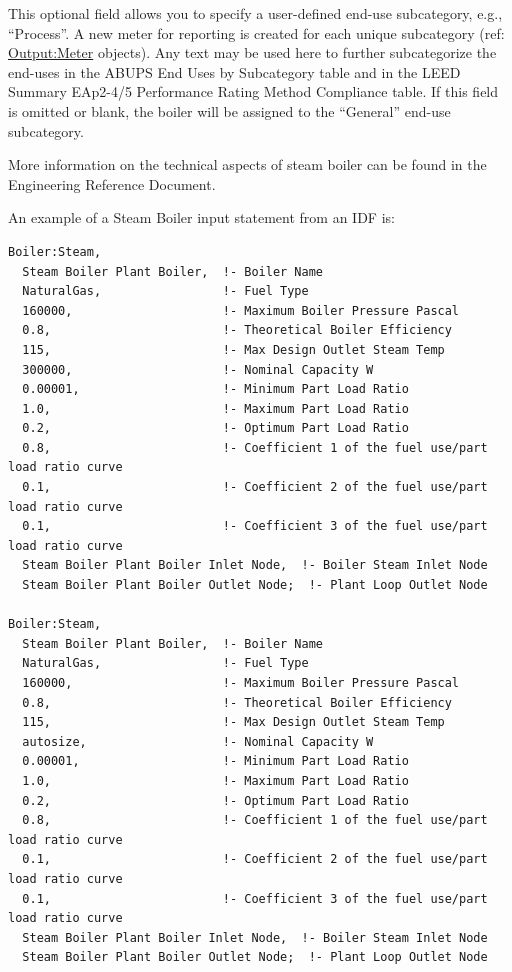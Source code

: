 This optional field allows you to specify a user-defined end-use subcategory, e.g., ``Process''. A new meter for reporting is created for each unique subcategory (ref: \hyperref[outputmeter-and-outputmetermeterfileonly]{Output:Meter} objects). Any text may be used here to further subcategorize the end-uses in the ABUPS End Uses by Subcategory table and in the LEED Summary EAp2-4/5 Performance Rating Method Compliance table. If this field is omitted or blank, the boiler will be assigned to the ``General'' end-use subcategory.


More information on the technical aspects of steam boiler can be found in the Engineering Reference Document.

An example of a Steam Boiler input statement from an IDF is:

\begin{lstlisting}
Boiler:Steam,
  Steam Boiler Plant Boiler,  !- Boiler Name
  NaturalGas,                 !- Fuel Type
  160000,                     !- Maximum Boiler Pressure Pascal
  0.8,                        !- Theoretical Boiler Efficiency
  115,                        !- Max Design Outlet Steam Temp
  300000,                     !- Nominal Capacity W
  0.00001,                    !- Minimum Part Load Ratio
  1.0,                        !- Maximum Part Load Ratio
  0.2,                        !- Optimum Part Load Ratio
  0.8,                        !- Coefficient 1 of the fuel use/part load ratio curve
  0.1,                        !- Coefficient 2 of the fuel use/part load ratio curve
  0.1,                        !- Coefficient 3 of the fuel use/part load ratio curve
  Steam Boiler Plant Boiler Inlet Node,  !- Boiler Steam Inlet Node
  Steam Boiler Plant Boiler Outlet Node;  !- Plant Loop Outlet Node

Boiler:Steam,
  Steam Boiler Plant Boiler,  !- Boiler Name
  NaturalGas,                 !- Fuel Type
  160000,                     !- Maximum Boiler Pressure Pascal
  0.8,                        !- Theoretical Boiler Efficiency
  115,                        !- Max Design Outlet Steam Temp
  autosize,                   !- Nominal Capacity W
  0.00001,                    !- Minimum Part Load Ratio
  1.0,                        !- Maximum Part Load Ratio
  0.2,                        !- Optimum Part Load Ratio
  0.8,                        !- Coefficient 1 of the fuel use/part load ratio curve
  0.1,                        !- Coefficient 2 of the fuel use/part load ratio curve
  0.1,                        !- Coefficient 3 of the fuel use/part load ratio curve
  Steam Boiler Plant Boiler Inlet Node,  !- Boiler Steam Inlet Node
  Steam Boiler Plant Boiler Outlet Node;  !- Plant Loop Outlet Node
\end{lstlisting}

